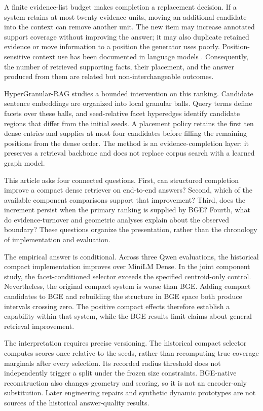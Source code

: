 \documentclass[11pt,a4paper]{article}
\newcommand{\hgrag}{HyperGranular-RAG\xspace}
\begin{document}
A finite evidence-list budget makes completion a replacement decision. If a system
retains at most twenty evidence units, moving an additional candidate into the
context can remove another unit. The new item may increase annotated support
coverage without improving the answer; it may also duplicate retained
evidence or move information to a position the generator uses poorly.
Position-sensitive context use has been documented in language models
\citep{liu2024lostmiddle}. Consequently, the number of retrieved supporting
facts, their placement, and the answer produced from them are related but
non-interchangeable outcomes.

\hgrag studies a bounded intervention on this ranking. Candidate sentence
embeddings are organized into local granular balls. Query terms define facets
over these balls, and seed-relative facet hyperedges identify candidate
regions that differ from the initial seeds. A placement policy retains the
first ten dense entries and supplies at most four candidates before filling
the remaining positions from the dense order. The method is an
evidence-completion layer: it preserves a retrieval backbone and does not
replace corpus search with a learned graph model.

This article asks four connected questions. First, can structured completion
improve a compact dense retriever on end-to-end answers? Second, which of the
available component comparisons support that improvement? Third, does the
increment persist when the primary ranking is supplied by BGE? Fourth, what
do evidence-turnover and geometric analyses explain about the observed
boundary? These questions organize the presentation, rather than the
chronology of implementation and evaluation.

The empirical answer is conditional. Across three Qwen evaluations, the
historical compact implementation improves over MiniLM Dense. In the joint
component study, the facet-conditioned selector exceeds the specified
centroid-only control. Nevertheless, the original compact system is worse
than BGE. Adding compact candidates to BGE and rebuilding the structure in
BGE space both produce intervals crossing zero. The positive compact effects
therefore establish a capability within that system, while the BGE results
limit claims about general retrieval improvement.

The interpretation requires precise versioning. The historical compact
selector computes scores once relative to the seeds, rather than recomputing
true coverage marginals after every selection. Its recorded radius threshold
does not independently trigger a split under the frozen size constraints.
BGE-native reconstruction also changes geometry and scoring, so it is not
an encoder-only substitution. Later engineering repairs and synthetic dynamic
prototypes are not sources of the historical answer-quality results.
\end{document}
